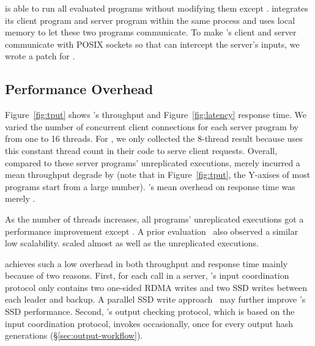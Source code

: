 \xxx is able to run all \nprog evaluated programs without modifying them except 
\calvin. \calvin integrates its client program and server program within the 
same process and uses local memory to let these two programs communicate. To 
make \calvin's client and server communicate with POSIX sockets so that \xxx 
can intercept the server's inputs, we wrote a \nlinescalvin patch for \calvin.

\subsection{Performance Overhead} \label{sec:overhead}

Figure~\ref{fig:tput} shows \xxx's throughput and Figure~\ref{fig:latency} 
response time. We varied the number of concurrent client connections for each 
server program by from one to 16 threads. For \calvin, we only collected the 
8-thread result because \calvin uses this constant thread count in their code 
to serve client requests. Overall, compared to these server programs' 
unreplicated executions, \xxx merely incurred a mean throughput degrade by 
\tputoverhead (note that in Figure~\ref{fig:tput}, the Y-axises of most programs 
start from a large number). \xxx's mean overhead on response time was merely 
\latencyoverhead.

As the number of threads increases, all programs' unreplicated executions 
got a performance improvement except \memcached. A prior 
evaluation~\cite{rex:eurosys14} also observed a similar \memcached low 
scalability. \xxx scaled almost as well as the unreplicated executions.

\xxx achieves such a low overhead in both throughput and response time mainly 
because of two reasons. First, for each \recv call in a server, \xxx's input 
coordination protocol only contains two one-sided RDMA writes and two SSD writes 
between each leader and backup. A parallel SSD write 
approach~\cite{Bessani:usenix13} may further improve \xxx's SSD performance.  
Second, \xxx's output checking protocol, which is based on the input 
coordination protocol, invokes occasionally, once for every \thashcomp output 
hash generations (\S\ref{sec:output-workflow}).


